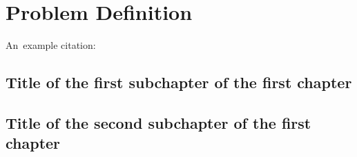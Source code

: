 \chapter{Problem Definition}

An~example citation: \cite{Andel07}

\section{Title of the first subchapter of the first chapter}

\section{Title of the second subchapter of the first chapter}
